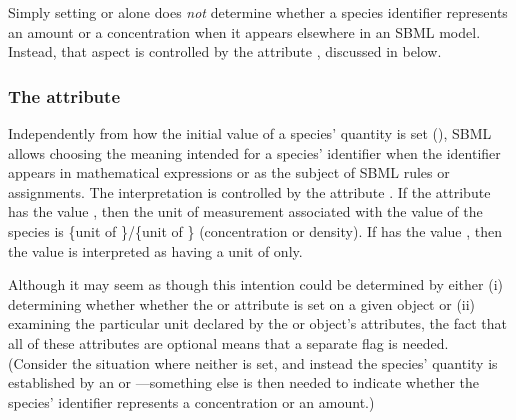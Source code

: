 Simply setting  or
 alone does \emph{not} determine
whether a species identifier represents an amount or a
concentration when it appears elsewhere in an SBML model.
Instead, that aspect is controlled by the attribute
, discussed in
 below.


\subsubsection{The  attribute}
\label{sec:species-units}

Independently from how the initial value of a species' quantity is
set (), SBML allows
choosing the meaning intended for a species' identifier when the
identifier appears in mathematical expressions or as the subject
of SBML rules or assignments.  The interpretation is controlled by
the attribute .  If the attribute has
the value , then the unit of measurement associated
with the value of the species is \{unit of
\}/\{unit of \} (\ie concentration
or density).  If  has the value
, then the value is interpreted as having a unit of
 only.

Although it may seem as though this intention could be determined
by either (i) determining whether whether the
 or  attribute is
set on a given \Species object or (ii) examining the particular
unit declared by the \Species or \Model object's
 attributes, the fact that all of these
attributes are optional means that a separate flag is needed.
(Consider the situation where neither is set, and instead the
species' quantity is established by an \InitialAssignment or
\AssignmentRule---something else is then needed to indicate
whether the species' identifier represents a concentration or an
amount.)

%

